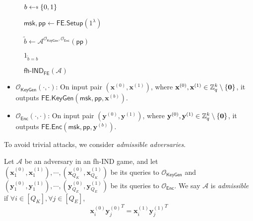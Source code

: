 \begin{figure}[h]
\centering

	\begin{minipage}[t]{0.4\textwidth}
	\begin{algorithm}[H]
	\caption{$\textsf{fh-IND}_{\textsf{FE}}(\mathcal{A})$}
	\label{alg:ind-fh-IPFE}
	\begin{algorithmic}[1]
		\State $b \getsdollar \{0, 1\}$

		\State $\textsf{msk}, \textsf{pp} \gets \textsf{FE.Setup}(1^\lambda)$

		\State $\tilde{b} \gets \mathcal{A}^{\mathcal{O}_{\textsf{KeyGen}}, \mathcal{O}_{\textsf{Enc}}} ( \textsf{pp} )$

		\State \Return $1_{\tilde{b} = b}$
	\end{algorithmic}
	\end{algorithm}
	\end{minipage}

\label{fig:ind-fh-IPFE}
\end{figure}

\begin{itemize}

	\item $\mathcal{O}_{\textsf{KeyGen}}(\cdot, \cdot)$: On input pair $(\mathbf{x}^{(0)}, \mathbf{x}^{(1)})$, where $\mathbf{x}^{(0)}, \mathbf{x}^{(1)} \in \mathbb{Z}_q^k \setminus \{\mathbf{0}\}$, it outputs $\textsf{FE.KeyGen}(\textsf{msk}, \textsf{pp}, \mathbf{x}^{(b)} )$.

	\item $\mathcal{O}_{\textsf{Enc}}(\cdot, \cdot)$: On input pair $(\mathbf{y}^{(0)}, \mathbf{y}^{(1)})$, where $\mathbf{y}^{(0)}, \mathbf{y}^{(1)} \in \mathbb{Z}_q^k \setminus \{\mathbf{0}\}$, it outputs $\textsf{FE.Enc}(\textsf{msk}, \textsf{pp}, \mathbf{y}^{(b)} )$.

\end{itemize}

\noindent To avoid trivial attacks, we consider \emph{admissible adversaries}.

\begin{definition}

	Let $\mathcal{A}$ be an adversary in an \textsf{fh-IND} game, and let $ (\mathbf{x}_1^{(0)}, \mathbf{x}_1^{(1)}), \cdots, (\mathbf{x}_{Q_K}^{(0)}, \mathbf{x}_{Q_K}^{(1)})$ be its queries to $\mathcal{O}_{\textsf{KeyGen}}$ and $(\mathbf{y}_1^{(0)}, \mathbf{y}_1^{(1)}), \cdots, (\mathbf{y}_{Q_E}^{(0)}, \mathbf{y}_{Q_E}^{(1)})$ be its queries to $\mathcal{O}_{\textsf{Enc}}$.
	We say $\mathcal{A}$ is \emph{admissible} if $\forall i \in [Q_K], \forall j \in [Q_E]$,
\[
	{\mathbf{x}^{(0)}_{i}} {\mathbf{y}^{(0)}_{j}}^T = {\mathbf{x}^{(1)}_{i}} {\mathbf{y}^{(1)}_{j}}^T
\]

\end{definition}


